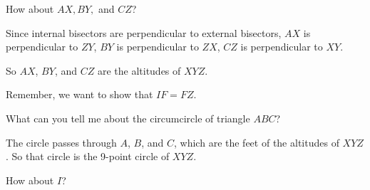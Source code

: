 How about $AX, BY, $ and $CZ$?



Since internal bisectors are perpendicular to external bisectors, $AX$ is perpendicular to $ZY$, $BY$ is perpendicular to $ZX$, $CZ$ is perpendicular to $XY$.

So $AX$, $BY$, and $CZ$ are the altitudes of $XYZ$.

Remember, we want to show that $IF = FZ$.

What can you tell me about the circumcircle of triangle $ABC$?







The circle passes through $A$, $B$, and $C$, which are the feet of the altitudes of $XYZ$. So that circle is the 9-point circle of $XYZ$.

How about $I$?





